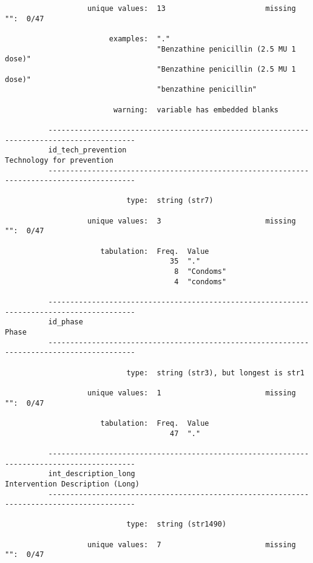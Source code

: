 \documentclass{article}
\begin{document}
\begin{verbatim}
                   unique values:  13                       missing "":  0/47
          
                        examples:  "."
                                   "Benzathine penicillin (2.5 MU 1 dose)"
                                   "Benzathine penicillin (2.5 MU 1 dose)"
                                   "benzathine penicillin"
          
                         warning:  variable has embedded blanks
          
          ------------------------------------------------------------------------------------------
          id_tech_prevention                                               Technology for prevention
          ------------------------------------------------------------------------------------------
          
                            type:  string (str7)
          
                   unique values:  3                        missing "":  0/47
          
                      tabulation:  Freq.  Value
                                      35  "."
                                       8  "Condoms"
                                       4  "condoms"
          
          ------------------------------------------------------------------------------------------
          id_phase                                                                             Phase
          ------------------------------------------------------------------------------------------
          
                            type:  string (str3), but longest is str1
          
                   unique values:  1                        missing "":  0/47
          
                      tabulation:  Freq.  Value
                                      47  "."
          
          ------------------------------------------------------------------------------------------
          int_description_long                                       Intervention Description (Long)
          ------------------------------------------------------------------------------------------
          
                            type:  string (str1490)
          
                   unique values:  7                        missing "":  0/47
          

\end{verbatim}
\end{document}

